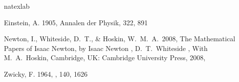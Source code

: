 \documentclass{utthesis}
\begin{document}
\backmatter

\printindex

\cleardoublepage
{}


\begin{thebibliography}{}
\expandafter\ifx\csname natexlab\endcsname\relax\def\natexlab#1{#1}\fi

 Einstein, A.{} 1905, Annalen der Physik, 322, 891 

 Newton, I., Whiteside, D.~T., \& Hoskin, W.~M.~A.\ 2008, The Mathematical Papers of Isaac Newton, by Isaac Newton , D.~T.~Whiteside , With M.~A.~Hoskin, Cambridge, UK: Cambridge University Press, 2008,  

 Zwicky, F.{} 1964, \apj, 140, 1626 
\end{thebibliography}

\begin{UTvita}
\lipsum[1]
\end{UTvita}
\end{document}
